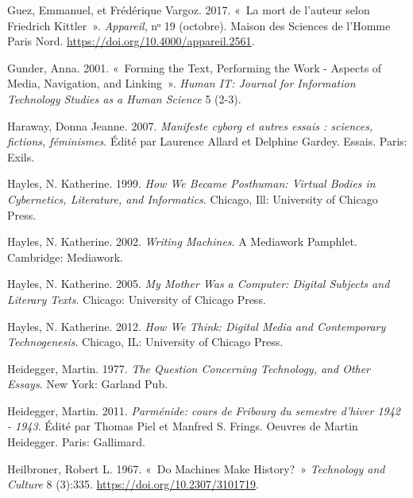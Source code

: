 \begin{CSLReferences}{1}{0}
\leavevmode{}%
Guez, Emmanuel, et Frédérique Vargoz. 2017. {«~{La mort de l'auteur
selon Friedrich Kittler}~»}. \emph{Appareil}, nᵒ 19 (octobre). {Maison
des Sciences de l'Homme Paris Nord}.
\url{https://doi.org/10.4000/appareil.2561}.

\leavevmode{}%
Gunder, Anna. 2001. {«~Forming the {Text}, {Performing} the {Work} -
{Aspects} of {Media}, {Navigation}, and {Linking}~»}. \emph{Human IT:
Journal for Information Technology Studies as a Human Science} 5 (2-3).

\leavevmode{}%
Haraway, Donna Jeanne. 2007. \emph{{Manifeste cyborg et autres essais :
sciences, fictions, f{é}minismes}}. Édité par Laurence Allard et
Delphine Gardey. {Essais}. {Paris}: {Exils}.

\leavevmode{}%
Hayles, N. Katherine. 1999. \emph{How {We Became Posthuman}: {Virtual
Bodies} in {Cybernetics}, {Literature}, and {Informatics}}. {Chicago,
Ill}: {University of Chicago Press}.

\leavevmode{}%
Hayles, N. Katherine. 2002. \emph{Writing {Machines}}. A {Mediawork}
Pamphlet. {Cambridge}: {Mediawork}.

\leavevmode{}%
Hayles, N. Katherine. 2005. \emph{My {Mother} Was a {Computer}: {Digital
Subjects} and {Literary Texts}}. {Chicago}: {University of Chicago
Press}.

\leavevmode{}%
Hayles, N. Katherine. 2012. \emph{How {We Think}: {Digital Media} and
{Contemporary Technogenesis}}. {Chicago, IL}: {University of Chicago
Press}.

\leavevmode{}%
Heidegger, Martin. 1977. \emph{The {Question Concerning Technology}, and
{Other Essays}}. {New York}: {Garland Pub}.

\leavevmode{}%
Heidegger, Martin. 2011. \emph{{Parm{é}nide: cours de Fribourg du
semestre d'hiver 1942 - 1943}}. Édité par Thomas Piel et Manfred S.
Frings. {Oeuvres de Martin Heidegger}. {Paris}: {Gallimard}.

\leavevmode{}%
Heilbroner, Robert L. 1967. {«~Do {Machines Make History}?~»}
\emph{Technology and Culture} 8 (3):335.
\url{https://doi.org/10.2307/3101719}.


\end{CSLReferences}
